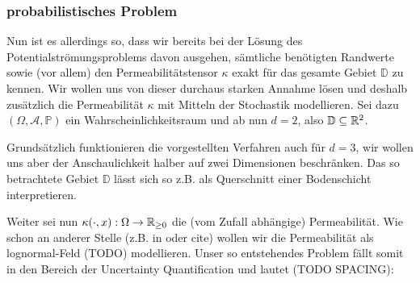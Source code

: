 \subsubsection{probabilistisches Problem}
Nun ist es allerdings so, dass wir bereits bei der Lösung des Potentialströmungsproblems davon ausgehen, sämtliche benötigten Randwerte sowie (vor allem) den Permeabilitätstensor $\kappa$ exakt für das gesamte Gebiet $\mathbb{D}$ zu kennen.
Wir wollen uns von dieser durchaus starken Annahme lösen und deshalb zusätzlich die Permeabilität $\kappa$ mit Mitteln der Stochastik modellieren.
Sei dazu $(\Omega, \mathcal{A},\mathbb{P})$ ein Wahrscheinlichkeitsraum und ab nun $d=2$, also $\mathbb{D} \subseteq \mathbb{R}^2$.
\begin{Bemerkung}
	Grundsätzlich funktionieren die vorgestellten Verfahren auch für $d=3$, wir wollen uns aber der Anschaulichkeit halber auf zwei Dimensionen beschränken. Das so betrachtete Gebiet $\mathbb{D}$ lässt sich so z.B. als Querschnitt einer Bodenschicht interpretieren.
\end{Bemerkung} 
Weiter sei nun $\kappa (\cdot,x): \Omega \rightarrow \mathbb{R}_{\geq0}$ die (vom Zufall abhängige) Permeabilität.
Wie schon an anderer Stelle (z.B. in \cite{kumar2018multigrid} oder cite) wollen wir die Permeabilität als lognormal-Feld (TODO) modellieren.
Unser so entstehendes Problem fällt somit in den Bereich der Uncertainty Quantification und lautet (TODO SPACING): 

